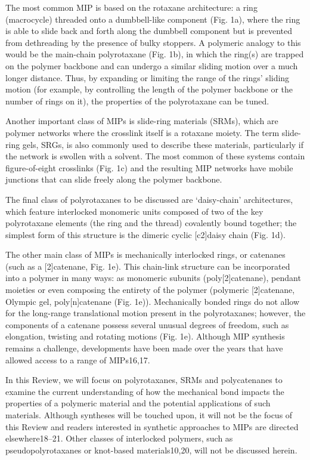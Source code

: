 \documentclass[../../main-notes.tex]{subfiles}
\begin{document}
The most common MIP is based on the rotaxane architecture: a ring (macrocycle) threaded onto a dumbbell-like component (Fig. 1a), where the ring is able to slide back and forth along the dumbbell component but is prevented from dethreading by the presence of bulky stoppers. 
A polymeric analogy to this would be the main-chain polyrotaxane (Fig. 1b), in which the ring(s) are trapped on the polymer backbone and can undergo a similar sliding motion over a much longer distance. 
Thus, by expanding or limiting the range of the rings’ sliding motion (for example, by controlling the length of the polymer backbone or the number of rings on it), the properties of the polyrotaxane can be tuned. 

Another important class of MIPs is slide-ring materials (SRMs), which are polymer networks where the crosslink itself is a rotaxane moiety. 
The term slide-ring gels, SRGs, is also commonly used to describe these materials, particularly if the network is swollen with a solvent. 
The most common of these systems contain figure-of-eight crosslinks (Fig. 1c) and the resulting MIP networks have mobile junctions that can slide freely along the polymer backbone. 

The final class of polyrotaxanes to be discussed are ‘daisy-chain’ architectures, which feature interlocked monomeric units composed of two of the key polyrotaxane elements (the ring and the thread) covalently bound together; the simplest form of this structure is the dimeric cyclic [c2]daisy chain (Fig. 1d).

The other main class of MIPs is mechanically interlocked rings, or catenanes (such as a [2]catenane, Fig. 1e). 
This chain-link structure can be incorporated into a polymer in many ways: as monomeric subunits (poly[2]catenane), pendant moieties or even composing the entirety of the polymer (polymeric [2]catenane, Olympic gel, poly[n]catenane (Fig. 1e)). 
Mechanically bonded rings do not allow for the long-range translational motion present in the polyrotaxanes; however, the components of a catenane possess several unusual degrees of freedom, such as elongation, twisting and rotating motions (Fig. 1e). 
Although MIP synthesis remains a challenge, developments have been made over the years that have allowed access to a range of MIPs16,17. 

In this Review, we will focus on polyrotaxanes, SRMs and polycatenanes to examine the current understanding of how the mechanical bond impacts the properties of a polymeric material and the potential applications of such materials. 
Although syntheses will be touched upon, it will not be the focus of this Review and readers interested in synthetic approaches to MIPs are directed elsewhere18–21. 
Other classes of interlocked polymers, such as pseudopolyrotaxanes or knot-based materials10,20, will not be discussed herein.
\end{document}
